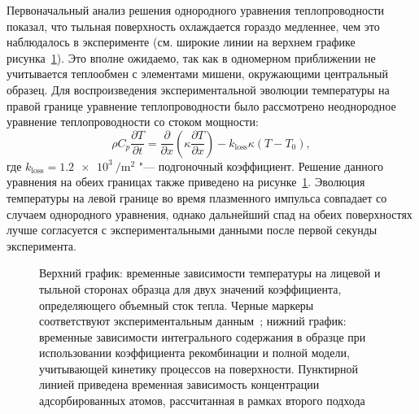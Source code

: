 Первоначальный анализ решения однородного уравнения теплопроводности показал, что тыльная поверхность охлаждается гораздо медленнее, чем это наблюдалось в эксперименте (см. широкие линии на верхнем графике рисунка~\cref{fig:ch3/QSPA_T_ret}). Это вполне ожидаемо, так как в одномерном приближении не учитывается теплообмен с элементами мишени, окружающими центральный образец. Для воспроизведения экспериментальной эволюции температуры на правой границе уравнение теплопроводности было рассмотрено неоднородное уравнение теплопроводности со стоком мощности:
\begin{equation}
	\label{eq:ch3/QSPA_heat_transfer}
	\rho C_p \frac{\partial T}{ \partial t} = \frac{\partial}{\partial x}\left( \kappa \frac{\partial T}{\partial x} \right)  - k_\mathrm{loss} \kappa \left( T-T_0 \right),
\end{equation}
где \( k_\mathrm{loss}=\SI{1.2e3}{\per\meter\squared} \) "--- подгоночный коэффициент. Решение данного уравнения на обеих границах также приведено на рисунке~\cref{fig:ch3/QSPA_T_ret}. Эволюция температуры на левой границе во время плазменного импульса совпадает со случаем однородного уравнения, однако дальнейший спад на обеих поверхностях лучше согласуется с экспериментальными данными после первой секунды эксперимента.

\begin{figure}[ht]
	\caption{Верхний график: временные зависимости температуры на лицевой и тыльной сторонах образца для двух значений коэффициента, определяющего объемный сток тепла. Черные маркеры соответствуют экспериментальным данным~\cite{Poskakalov2020}; нижний график: временные зависимости интегрального содержания в образце при использовании коэффициента рекомбинации и полной модели, учитывающей кинетику процессов на поверхности. Пунктирной линией приведена временная зависимость концентрации адсорбированных атомов, рассчитанная в рамках второго подхода }\label{fig:ch3/QSPA_T_ret}
\end{figure}

